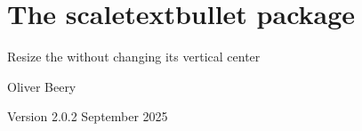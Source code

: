 \documentclass{article}
\begin{document}
\section*{\Large The \textsf{scaletextbullet} package}

Resize the \texttt{\string\textbullet} without changing its vertical center

Oliver Beery

Version 2.0.2 September 2025

\end{document}

